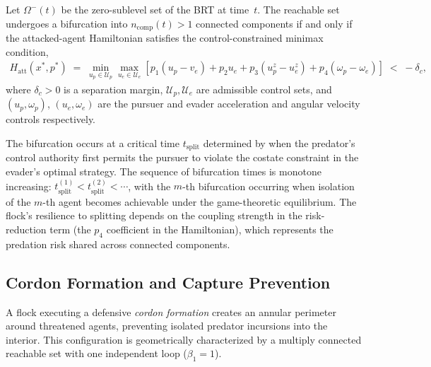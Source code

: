 \begin{proposition}
\label{prop:bifurcation}
Let $\Omega^{-}(t)$ be the zero-sublevel set of the BRT at time~$t$.
The reachable set undergoes a bifurcation into $n_{\mathrm{comp}}(t) > 1$
connected components if and only if the attacked-agent Hamiltonian satisfies
the control-constrained minimax condition,
%
\begin{align}
\label{eq:bifurcation_condition}
H_{\mathrm{att}}(x^*, p^*) \;=\; \min_{u_p \in \mathcal{U}_p} \max_{u_e \in \mathcal{U}_e}
\left[
  p_1(u_p - v_e) + p_2 u_e + p_3(u_p^{z} - u_e^z) + p_4(\omega_p - \omega_e)
\right] \;<\; -\delta_c,
\end{align}
%
where $\delta_c > 0$ is a separation margin, $\mathcal{U}_p, \mathcal{U}_e$ are
admissible control sets, and $(u_p, \omega_p)$, $(u_e, \omega_e)$ are the
pursuer and evader acceleration and angular velocity controls respectively.
\end{proposition}

\begin{remark}
\label{rem:bifurcation_time}
The bifurcation occurs at a critical time $t_{\mathrm{split}}$ determined by
when the predator's control authority first permits the pursuer to violate
the costate constraint in the evader's optimal strategy. The sequence of
bifurcation times is monotone increasing: $t_{\mathrm{split}}^{(1)} < t_{\mathrm{split}}^{(2)} < \cdots$,
with the $m$-th bifurcation occurring when isolation of the $m$-th agent
becomes achievable under the game-theoretic equilibrium. The flock's resilience
to splitting depends on the coupling strength in the risk-reduction term
(the $p_4$ coefficient in the Hamiltonian), which represents the predation
risk shared across connected components.
\end{remark}

\subsection{Cordon Formation and Capture Prevention}
\label{sec:d310_cordon}

A flock executing a defensive \emph{cordon formation} creates an annular
perimeter around threatened agents, preventing isolated predator incursions into
the interior. This configuration is geometrically characterized by a multiply
connected reachable set with one independent loop ($\beta_1 = 1$).

